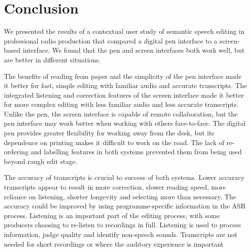 \section{Conclusion}\label{sec:paper-conclusion}
We presented the results of a contextual user study of semantic speech editing in professional radio production that
compared a digital pen interface to a screen-based interface.  We found that the pen and screen interfaces both work
well, but are better in different situations.

The benefits of reading from paper and the simplicity of the pen interface made it better for fast, simple editing with
familiar audio and accurate transcripts.  The integrated listening and correction features of the screen interface made
it better for more complex editing with less familiar audio and less accurate transcripts.  Unlike the pen, the screen
interface is capable of remote collaboration, but the pen interface may work better when working with others
face-to-face.  The digital pen provides greater flexibility for working away from the desk, but its dependence on
printing makes it difficult to work on the road.  The lack of re-ordering and labelling features in both systems
prevented them from being used beyond rough edit stage.

The accuracy of transcripts is crucial to success of both systems. Lower accuracy transcripts appear to result in more
correction, slower reading speed, more reliance on listening, shorter longevity and selecting more than necessary. The
accuracy could be improved by using programme-specific information in the ASR process.  Listening is an
important part of the editing process, with some producers choosing to re-listen to recordings in full.  Listening is
used to process information, judge quality and identify non-speech sounds. Transcripts are not needed for short
recordings or where the auditory experience is important

